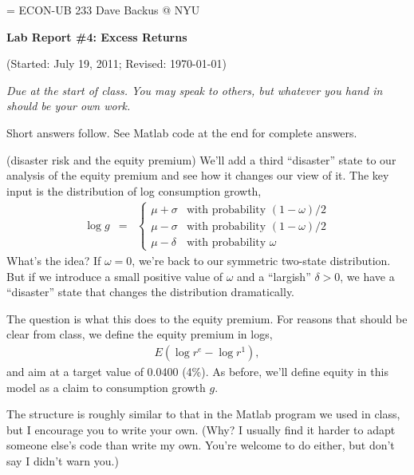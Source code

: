 \documentclass[11pt]{exam}
\begin{document}
\parskip=\bigskipamount
\parindent=0.0in
\thispagestyle{empty}
{\large ECON-UB 233 \hfill Dave Backus @ NYU}

\bigskip\bigskip
\centerline{\Large \bf Lab Report \#4: Excess Returns}
\centerline{(Started: July 19, 2011; Revised: \today)}

\bigskip
{\it Due at the start of class.
You may speak to others, but whatever you hand in should be your own work.}

\begin{questions}

\begin{solution}
Short answers follow.  See Matlab code at the end for complete answers.
\end{solution}


\question (disaster risk and the equity premium)
We'll add a third ``disaster'' state to our analysis of the equity premium
and see how it changes our view of it.
The key input is the distribution of log consumption growth,
\begin{eqnarray*}
    \log g &=& \left\{
                \begin{array}{ll}
                \mu + \sigma & \mbox{with probability } (1-\omega)/2 \\
                \mu - \sigma & \mbox{with probability } (1-\omega)/2 \\
                \mu - \delta & \mbox{with probability } \omega
                \end{array}
                \right.
\end{eqnarray*}
What's the idea?
If $\omega = 0$, we're back to our symmetric two-state distribution.
But if we introduce a small positive value of $\omega$ and a ``largish'' $\delta>0$,
we have a ``disaster'' state that changes the distribution dramatically.

The question is what this does to the equity premium.
For reasons that should be clear from class,
we define the equity premium in logs,
\begin{eqnarray*}
    E ( \log r^e - \log r^1 ) ,
\end{eqnarray*}
and aim at a target value of 0.0400 (4\%).
As before, we'll define equity in this model as a claim to consumption growth $g$.

The structure is roughly similar to that in the Matlab program we used in class,
but I encourage you to write your own.
(Why?   I usually find it harder to adapt someone else's code than write my own.
You're welcome to do either, but don't say I didn't warn you.)


\end{questions}
\end{document}
